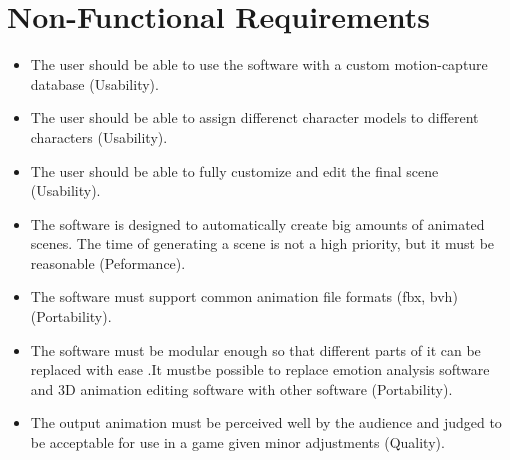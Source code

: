 \section{Non-Functional Requirements}

\begin{itemize}
\item The user should be able to use the software with a custom motion-capture database (Usability).
\item The user should be able to assign differenct character models to different characters (Usability).
\item The user should be able to fully customize and edit the final scene (Usability).
\item The software is designed to automatically create big amounts of animated scenes. The time of generating a scene is not a high priority, but it must be reasonable (Peformance).
\item The software must support common animation file formats (fbx, bvh) (Portability).
\item The software must be modular enough so that different parts of it can be replaced with ease .It mustbe possible to replace emotion analysis software and 3D animation editing software with other software (Portability).
\item The output animation must be perceived well by the audience and judged to be acceptable for use in a game given minor adjustments (Quality).
\end{itemize}
